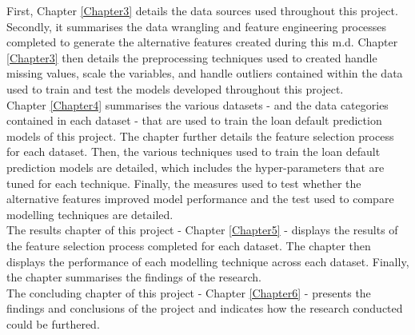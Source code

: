 First, Chapter \ref{Chapter3} details the data sources used throughout this project. Secondly, it summarises the data wrangling and feature engineering processes completed to generate the alternative features created during this m.d. Chapter \ref{Chapter3} then details the preprocessing techniques used to created handle missing values, scale the variables, and handle outliers contained within the data used to train and test the models developed throughout this project. \\

Chapter \ref{Chapter4} summarises the various datasets - and the data categories contained in each dataset - that are used to train the loan default prediction models of this project. The chapter further details the feature selection process for each dataset. Then, the various techniques used to train the loan default prediction models are detailed, which includes the hyper-parameters that are tuned for each technique. Finally, the measures used to test whether the alternative features improved model performance and the test used to compare modelling techniques are detailed.  \\

The results chapter of this project - Chapter \ref{Chapter5} - displays the results of the feature selection process completed for each dataset. The chapter then displays the performance of each modelling technique across each dataset. Finally, the chapter summarises the findings of the research. \\

The concluding chapter of this project - Chapter \ref{Chapter6} - presents the findings and conclusions of the project and indicates how the research conducted could be furthered.  



